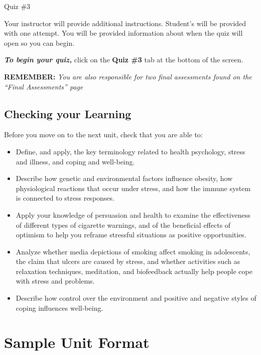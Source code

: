 \documentclass[
]{book}
\begin{document}
\begin{assessment}
{Quiz \#3}

Your instructor will provide additional instructions. Student's will be provided with one attempt. You will be provided information about when the quiz will open so you can begin.

\textbf{\emph{To begin your quiz,}} click on the \textbf{Quiz \#3} tab at the bottom of the screen.

\textbf{REMEMBER:} \emph{You are also responsible for two final assessments found on the ``Final Assessments'' page}
\end{assessment}

\hypertarget{checking-your-learning-12}{%
\section*{Checking your Learning}\label{checking-your-learning-12}}

\begin{progress}
Before you move on to the next unit, check that you are able to:

\begin{itemize}
\item
  Define, and apply, the key terminology related to health psychology, stress and illness, and coping and well-being.
\item
  Describe how genetic and environmental factors influence obesity, how physiological reactions that occur under stress, and how the immune system is connected to stress responses.
\item
  Apply your knowledge of persuasion and health to examine the effectiveness of different types of cigarette warnings, and of the beneficial effects of optimism to help you reframe stressful situations as positive opportunities.
\item
  Analyze whether media depictions of smoking affect smoking in adolescents, the claim that ulcers are caused by stress, and whether activities such as relaxation techniques, meditation, and biofeedback actually help people cope with stress and problems.
\item
  Describe how control over the environment and positive and negative styles of coping influences well-being.
\end{itemize}
\end{progress}

\hypertarget{sample-unit-format}{%
\chapter{Sample Unit Format}\label{sample-unit-format}}
\end{document}
